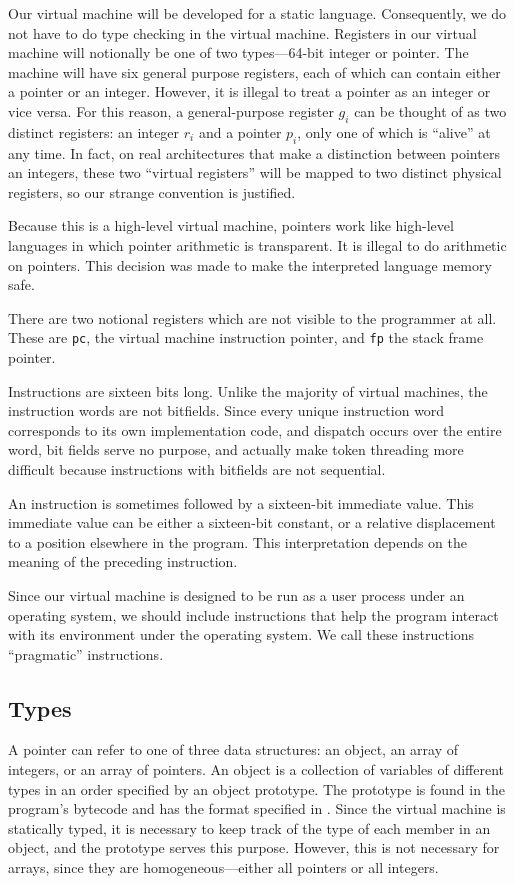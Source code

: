 		Our virtual machine will be developed for a static language. Consequently, we do not have to do type checking in the virtual machine. Registers in our virtual machine will notionally be one of two types---64-bit integer or pointer. The machine will have six general purpose registers, each of which can contain either a pointer or an integer. However, it is illegal to treat a pointer as an integer or vice versa. For this reason, a general-purpose register $g_i$ can be thought of as two distinct registers: an integer $r_i$ and a pointer $p_i$, only one of which is ``alive'' at any time. In fact, on real architectures that make a distinction between pointers an integers, these two ``virtual registers'' will be mapped to two distinct physical registers, so our strange convention is justified.
		
		Because this is a high-level virtual machine, pointers work like high-level languages in which pointer arithmetic is transparent. It is illegal to do arithmetic on pointers. This decision was made to make the interpreted language memory safe.
		
		There are two notional registers which are not visible to the programmer at all. These are \texttt{pc}, the virtual machine instruction pointer, and \texttt{fp} the stack frame pointer.
		
		Instructions are sixteen bits long. Unlike the majority of virtual machines, the instruction words are not bitfields. Since every unique instruction word corresponds to its own implementation code, and dispatch occurs over the entire word, bit fields serve no purpose, and actually make token threading more difficult because instructions with bitfields are not sequential.
		
		An instruction is sometimes followed by a sixteen-bit immediate value. This immediate value can be either a sixteen-bit constant, or a relative displacement to a position elsewhere in the program. This interpretation depends on the meaning of the preceding instruction.
		
		Since our virtual machine is designed to be run as a user process under an operating system, we should include instructions that help the program interact with its environment under the operating system. We call these instructions ``pragmatic'' instructions.
		
		\subsection{Types}
		A pointer can refer to one of three data structures: an object, an array of integers, or an array of pointers. An object is a collection of variables of different types in an order specified by an object prototype. The prototype is found in the program's bytecode and has the format specified in . Since the virtual machine is statically typed, it is necessary to keep track of the type of each member in an object, and the prototype serves this purpose. However, this is not necessary for arrays, since they are homogeneous---either all pointers or all integers.
		
